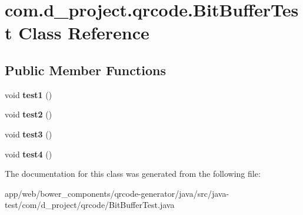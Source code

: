 \hypertarget{classcom_1_1d__project_1_1qrcode_1_1_bit_buffer_test}{}\section{com.\+d\+\_\+project.\+qrcode.\+Bit\+Buffer\+Test Class Reference}
\label{classcom_1_1d__project_1_1qrcode_1_1_bit_buffer_test}
\subsection*{Public Member Functions}
\begin{DoxyCompactItemize}
\item 
\mbox{\label{classcom_1_1d__project_1_1qrcode_1_1_bit_buffer_test_acc4f0992d73a48609e865d51e9640198}} 
void {\bfseries test1} ()
\item 
\mbox{\label{classcom_1_1d__project_1_1qrcode_1_1_bit_buffer_test_a2e333a9897b70a5bac8ab107c158bc1b}} 
void {\bfseries test2} ()
\item 
\mbox{\label{classcom_1_1d__project_1_1qrcode_1_1_bit_buffer_test_a7e4093e0cf1f45142f66da06face2f26}} 
void {\bfseries test3} ()
\item 
\mbox{\label{classcom_1_1d__project_1_1qrcode_1_1_bit_buffer_test_a6d08574dc80cb535147925609bceb895}} 
void {\bfseries test4} ()
\end{DoxyCompactItemize}


The documentation for this class was generated from the following file\+:\begin{DoxyCompactItemize}
\item 
app/web/bower\+\_\+components/qrcode-\/generator/java/src/java-\/test/com/d\+\_\+project/qrcode/Bit\+Buffer\+Test.\+java\end{DoxyCompactItemize}
